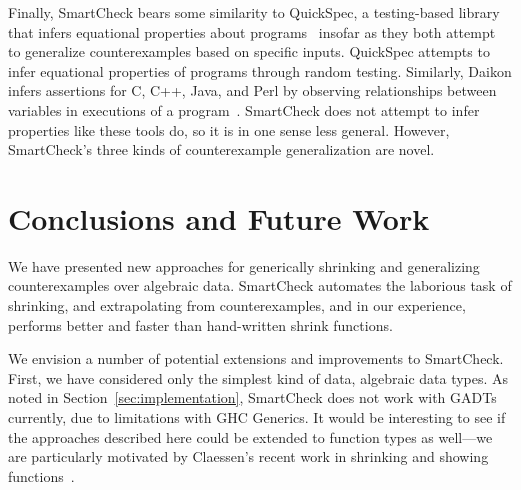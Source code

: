 \documentclass{sigplanconf}
\begin{document}
Finally, SmartCheck bears some similarity to QuickSpec, a testing-based library
that infers equational properties about programs~\cite{qs} insofar as they both
attempt to generalize counterexamples based on specific inputs.  QuickSpec
attempts to infer equational properties of programs through random testing.
Similarly, Daikon infers assertions for C, C++, Java, and Perl by observing
relationships between variables in executions of a program~\cite{daikon}.
SmartCheck does not attempt to infer properties like these tools do, so it is in
one sense less general.  However, SmartCheck's three kinds of counterexample
generalization are novel.



\section{Conclusions and Future Work}\label{sec:conclusions}

We have presented new approaches for generically shrinking and generalizing
counterexamples over algebraic data.  SmartCheck automates the laborious
task of shrinking, and extrapolating from counterexamples, and in our
experience, performs better and faster than hand-written shrink functions.

We envision a number of potential extensions and improvements to SmartCheck.
First, we have considered only the simplest kind of data, algebraic data types.
As noted in Section~\ref{sec:implementation}, SmartCheck does not work with
GADTs currently, due to limitations with GHC Generics.  It would be interesting
to see if the approaches described here could be extended to function types as
well---we are particularly motivated by Claessen's recent work in shrinking and
showing functions~\cite{claessen}.
\end{document}
